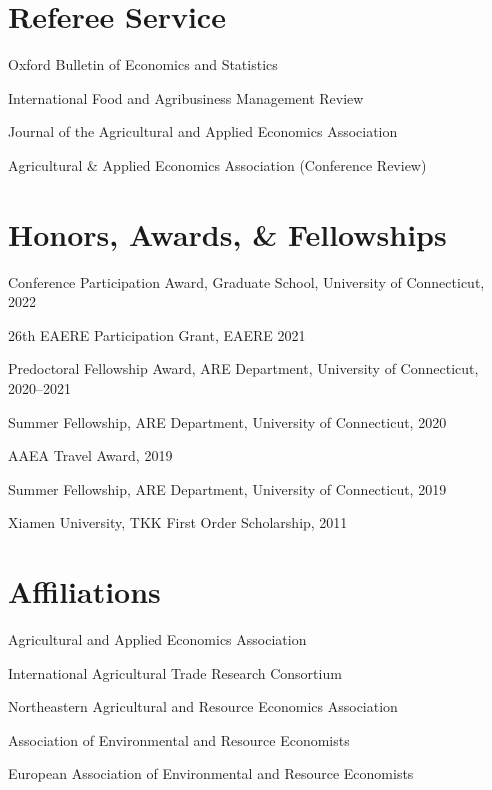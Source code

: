 \documentclass[10.5pt,letterpaper]{article}
\renewenvironment{itemize}{
	\begin{list}{}{
			\setlength{\leftmargin}{1.5em}
		}
	}{
	\end{list}
}
\begin{document}
	\section*{\textbf{Referee Service}}
	\begin{itemize}
		\item[-] Oxford Bulletin of Economics and Statistics
		\item[-] International Food and Agribusiness Management Review
		\item[-] Journal of the Agricultural and Applied Economics Association
		\item[-] Agricultural \& Applied Economics Association (Conference Review)
	\end{itemize}
	
	\section*{\textbf{Honors, Awards, \& Fellowships}}
	\begin{itemize}
		\item[-] Conference Participation Award, Graduate School, University of Connecticut, 2022
		\item[-] 26th EAERE Participation Grant, EAERE 2021
		\item[-] Predoctoral Fellowship Award, ARE Department, University of Connecticut, 2020–2021
		\item[-] Summer Fellowship, ARE Department, University of Connecticut, 2020
		\item[-] AAEA Travel Award, 2019
		\item[-] Summer Fellowship, ARE Department, University of Connecticut, 2019
		\item[-] Xiamen University, TKK First Order Scholarship, 2011
	\end{itemize}
	
	\section*{\textbf{Affiliations}}
	\begin{itemize}
		\item[-] Agricultural and Applied Economics Association
		\item[-] International Agricultural Trade Research Consortium
		\item[-] Northeastern Agricultural and Resource Economics Association
		\item[-] Association of Environmental and Resource Economists
		\item[-] European Association of Environmental and Resource Economists
	\end{itemize}
	
\end{document}
